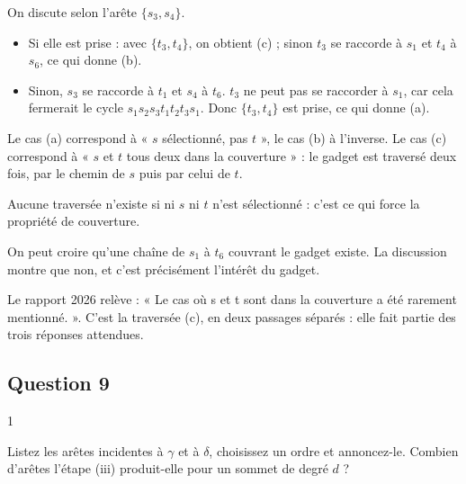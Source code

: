 \documentclass[11pt,a4paper]{article}
\providecommand{\tightlist}{\setlength{\itemsep}{0pt}\setlength{\parskip}{0pt}}
\begin{document}
On discute selon l'arête \(\{s_3,s_4\}\).

\begin{itemize}
\tightlist
\item
  Si elle est prise : avec \(\{t_3,t_4\}\), on obtient (c) ; sinon \(t_3\) se raccorde à \(s_1\) et \(t_4\) à \(s_6\), ce qui donne (b).
\item
  Sinon, \(s_3\) se raccorde à \(t_1\) et \(s_4\) à \(t_6\).
  \(t_3\) ne peut pas se raccorder à \(s_1\), car cela fermerait le cycle \(s_1s_2s_3t_1t_2t_3s_1\). Donc \(\{t_3,t_4\}\) est prise, ce qui donne (a).
\end{itemize}

Le cas (a) correspond à « \(s\) sélectionné, pas \(t\) », le cas (b) à l'inverse. Le cas (c) correspond à « \(s\) et \(t\) tous deux dans la couverture » : le gadget est traversé deux fois, par le chemin de \(s\) puis par celui de \(t\).

Aucune traversée n'existe si ni \(s\) ni \(t\) n'est sélectionné : c'est ce qui force la propriété de couverture.

\begin{piege}

On peut croire qu'une chaîne de \(s_1\) à \(t_6\) couvrant le gadget existe. La discussion montre que non, et c'est précisément l'intérêt du gadget.

\end{piege}

\begin{jury}

Le rapport 2026 relève : « Le cas où s et t sont dans la couverture a été rarement mentionné. ». C'est la traversée (c), en deux passages séparés : elle fait partie des trois réponses attendues.

\end{jury}

\hypertarget{question-9}{%
\subsection{Question 9}\label{question-9}}

\begin{indication}{1}

Listez les arêtes incidentes à \(\gamma\) et à \(\delta\), choisissez un ordre et annoncez-le. Combien d'arêtes l'étape (iii) produit-elle pour un sommet de degré \(d\) ?

\end{indication}
\end{document}
